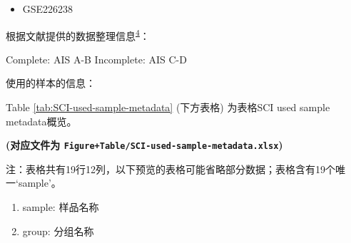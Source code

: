 \documentclass[
]{article}
\providecommand{\tightlist}{%
  \setlength{\itemsep}{0pt}\setlength{\parskip}{0pt}}
\begin{document}
\begin{itemize}
\tightlist
\item
  GSE226238
\end{itemize}

根据文献提供的数据整理信息\textsuperscript{\protect\hyperlink{ref-ProfilingImmunMorris2023}{4}}：

Complete: AIS A-B
Incomplete: AIS C-D

使用的样本的信息：

Table \ref{tab:SCI-used-sample-metadata} (下方表格) 为表格SCI used sample metadata概览。

\textbf{(对应文件为 \texttt{Figure+Table/SCI-used-sample-metadata.xlsx})}

\begin{center}\begin{tcolorbox}[colback=gray!10, colframe=gray!50, width=0.9\linewidth, arc=1mm, boxrule=0.5pt]注：表格共有19行12列，以下预览的表格可能省略部分数据；表格含有19个唯一`sample'。
\end{tcolorbox}
\end{center}
\begin{center}\begin{tcolorbox}[colback=gray!10, colframe=gray!50, width=0.9\linewidth, arc=1mm, boxrule=0.5pt]\begin{enumerate}\tightlist
\item sample: 样品名称
\item group: 分组名称
\end{enumerate}\end{tcolorbox}
\end{center}
\end{document}
